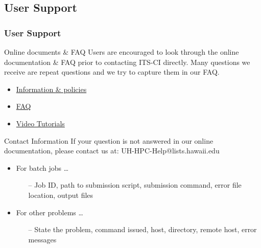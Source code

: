 

\subsection{User Support}
\begin{frame}
  \frametitle{User Support}

  \begin{block}{Online documents \& FAQ}
    Users are encouraged to look through the online documentation \& FAQ prior to contacting ITS-CI directly.  Many questions we receive are repeat questions and we try to capture them in our FAQ.~\\
		\begin{itemize}
		\item \href{http://datascience.hawaii.edu/hpc/}{Information \& policies}
		\item \href{http://go.hawaii.edu/jdG}{FAQ}
		\item \href{http://go.hawaii.edu/3A8}{Video Tutorials}
		\end{itemize}
  \end{block}
  \begin{block}{Contact Information}
    If your question is not answered in our online documentation, please contact us at: UH-HPC-Help@lists.hawaii.edu
    
    \begin{itemize}
    \item For batch jobs \ldots
      \begin{itemize}
      \item[--] Job ID, path to submission script, submission command, error file location, output files
      \end{itemize} 
    \item For other problems \ldots
      \begin{itemize}
      \item[--] State the problem, command issued, host, directory, remote host, error messages
      \end{itemize}
    \end{itemize}
  \end{block}
\end{frame}

